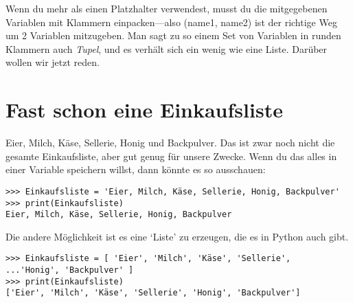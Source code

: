 Wenn du mehr als einen Platzhalter verwendest, musst du die mitgegebenen Variablen mit Klammern einpacken---also (name1, name2) ist der richtige Weg um 2 Variablen mitzugeben. Man sagt zu so einem Set von Variablen in runden Klammern auch \emph{Tupel}, und es verhält sich ein wenig wie eine Liste. Darüber wollen wir jetzt reden.

\section{Fast schon eine Einkaufsliste}

Eier, Milch, Käse, Sellerie, Honig und Backpulver. Das ist zwar noch nicht die gesamte Einkaufsliste, aber gut genug für unsere Zwecke. Wenn du das alles in einer Variable speichern willst, dann könnte es so ausschauen:

\begin{Verbatim}[frame=single]
>>> Einkaufsliste = 'Eier, Milch, Käse, Sellerie, Honig, Backpulver'
>>> print(Einkaufsliste)
Eier, Milch, Käse, Sellerie, Honig, Backpulver
\end{Verbatim}

Die andere Möglichkeit ist es eine `Liste' zu erzeugen, die es in Python auch gibt.

\begin{Verbatim}[frame=single]
>>> Einkaufsliste = [ 'Eier', 'Milch', 'Käse', 'Sellerie',
...'Honig', 'Backpulver' ]
>>> print(Einkaufsliste)
['Eier', 'Milch', 'Käse', 'Sellerie', 'Honig', 'Backpulver']
\end{Verbatim}

